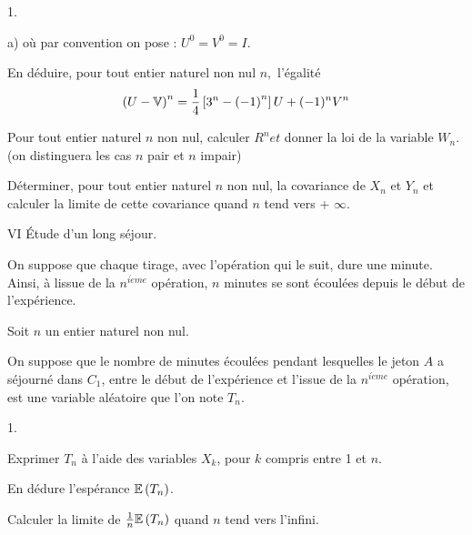 \documentclass[11pt]{article}%
\begin{document}
\begin{noliste}{1.}
\begin{noliste}{a)}
où par convention on pose : $U^{0} = V^{0} = I.$


\item En déduire, pour tout entier naturel non nul $n,$
l'égalité 
\[
\left( U-\mathbb{V}\right) ^{n} = \frac{1}{4}\left[ 3^{n}-\left( -1\right)
^{n}\right]
U + (-1)^{n}V^{n}
\]
\end{noliste}


\item Pour tout entier naturel $n$ non nul, calculer $R^{n}et$ donner
la
loi de la variable $W_{n}.$ (on distinguera les cas $n$ pair et $n$
impair)


\item Déterminer, pour tout entier naturel $n$ non nul, la covariance
de $X_{n}$ et $Y_{n}$ et calculer la limite de cette covariance quand
$n$
tend vers + $\infty.$
\end{noliste}


{\Large VI Étude d'un long séjour.}


On suppose que chaque tirage, avec l'opération qui le suit, dure une
minute. Ainsi, à lissue de la $n^{i\grave{e}me}$ opération, $n$
minutes se sont écoulées depuis le début de l'expérience.


Soit $n$ un entier naturel non nul.


On suppose que le nombre de minutes écoulées pendant lesquelles le
jeton $A$ a séjourné dans $C_{1}$, entre le début de
l'expérience et l'issue de la $n^{i\grave{e}me}$ opération, est une
variable aléatoire que l'on note $T_{n}.$


\begin{noliste}{1.}
 \setlength{\itemsep}{4mm}
\item Exprimer $T_{n}$ à l'aide des variables $X_{k}$, pour $k$ compris
entre 1 et $n.$


\item En dédure l'espérance $\mathbb{E}\left( T_{n}\right) $.


Calculer la limite de $\frac{1}{n}\mathbb{E}\left( T_{n}\right) $ quand $n$
tend vers l'infini.\newpage 
\end{noliste}
\end{document}
